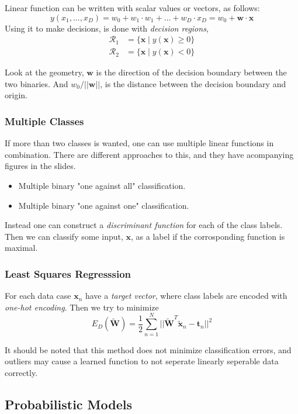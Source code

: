 Linear function can be written with scalar values or vectors, as follows:
\[
    y(x_1, ..., x_D) = w_0 + w_1 \cdot w_1 + \dots + w_D \cdot x_D = w_0 + \mathbf{w} \cdot \mathbf{x}
\]
Using it to make decisions, is done with \emph{decision regions},
\begin{align*}
    \mathcal{R}_1 &= \{\mathbf{x} \mid y(\mathbf{x}) \geq 0\} \\
    \mathcal{R}_2 &= \{\mathbf{x} \mid y(\mathbf{x}) < 0 \}
\end{align*}

Look at the geometry, $\mathbf{w}$ is the direction of the decision boundary between the two binaries.
And $w_0 / || \mathbf{w} ||$, is the distance between the decision boundary and origin.

\subsubsection{Multiple Classes}

If more than two classes is wanted, one can use multiple linear functions in combination.
There are different approaches to this, and they have acompanying figures in the slides.
\begin{itemize}
    \item Multiple binary "one against all" classification.
    \item Multiple binary "one against one" classification.
\end{itemize}

Instead one can construct a \emph{discriminant function} for each of the class labels.
Then we can classify some input, $\mathbf{x}$, as a label if the corrosponding function is maximal.

\subsubsection{Least Squares Regresssion}

For each data case $\mathbf{x}_n$ have a \emph{target vector}, where class labels are encoded with \emph{one-hot encoding}.
Then we try to minimize
\[
    E_D(\mathbf{\tilde{W}}) = \frac 1 2 \sum_{n=1}^N || \mathbf{\tilde{W}}^T \mathbf{\tilde{x}}_n - \mathbf{t}_n ||^2
\]

It should be noted that this method does not minimize classification errors, and outliers may cause a learned function to not seperate linearly seperable data correctly.

\subsection{Probabilistic Models}

